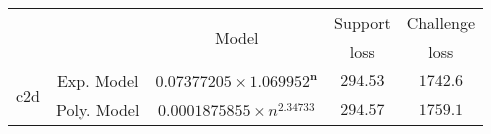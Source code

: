 \begin{tabular}{ccccc} 
\hline 
 &  & \multirow{2}{*}{Model} & Support & Challenge\tabularnewline 
 &  &  & loss  & loss\tabularnewline 
\hline 
\hline 
\multirow{2}{*}{c2d} & Exp. Model & $\mathbf{0.07377205\times 1.069952^{n}}$ & $\mathbf{294.53}$ & $\mathbf{1742.6}$ \tabularnewline 
 & Poly. Model & $0.0001875855\times n^{2.34733}$ & $294.57$ & $1759.1$ \tabularnewline 
\hline 
\end{tabular} 

